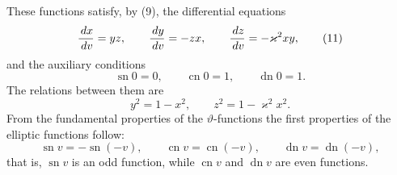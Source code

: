 \documentclass[11pt]{article}
\providecommand{\dd}{\,d}
\providecommand{\sn}{\operatorname{sn}}
\providecommand{\cn}{\operatorname{cn}}
\providecommand{\dn}{\operatorname{dn}}
\begin{document}
These functions satisfy, by (9), the differential equations
\begin{equation}
{\dd x\over\dd v}=yz,
\qquad
{\dd y\over\dd v}=-zx,
\qquad
{\dd z\over\dd v}=-\varkappa^2xy,
\tag{11}
\end{equation}
and the auxiliary conditions
\begin{equation}
\sn0=0,
\qquad \cn0=1,
\qquad \dn0=1.
\tag{12}
\end{equation}
The relations between them are
\begin{equation}
y^2=1-x^2,
\qquad
z^2=1-\varkappa^2x^2.
\tag{13}
\end{equation}
From the fundamental properties of the $\vartheta$-functions the first properties of the elliptic functions follow:
\[
\sn v=-\sn(-v),
\qquad
\cn v=\cn(-v),
\qquad
\dn v=\dn(-v),
\]
that is, $\sn v$ is an odd function, while $\cn v$ and $\dn v$ are even functions.
\end{document}
